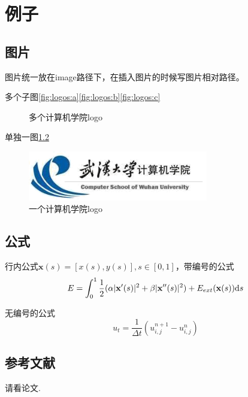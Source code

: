 \chapter{例子}
\section{图片}
图片统一放在image路径下，在插入图片的时候写图片相对路径。

多个子图\ref{fig:logos:a}\ref{fig:logos:b}\ref{fig:logos:c}

\begin{figure}[hp]
\centering
{}
\caption{多个计算机学院logo}
\label{fig:logos}
\end{figure}

单独一图\ref{fig:logo}
\begin{figure}[hp]
\centering
\includegraphics[angle=0, width=0.7\textwidth]{./image/cs-logo.png}
\caption{一个计算机学院logo}
\label{fig:logo}
\end{figure}


\section{公式}
行内公式$\mathbf{x}(s)=[x(s),y(s)],s\in[0,1]$，带编号的公式
\begin{equation} \label{eq:energy}
E=\int_{0}^{1}\frac{1}{2}(\alpha|\mathbf{x}'(s)|^{2}+\beta|\mathbf{x}''(s)|^{2})+E_{ext}(\mathbf{x}(s)) \mathrm{d} s
\end{equation}

无编号的公式
\begin{displaymath}
u_{t}=\frac{1}{\Delta t}(u_{i,j}^{n+1}-u_{i,j}^{n})
\end{displaymath}

\section{参考文献}
请看论文\cite{fem}.
